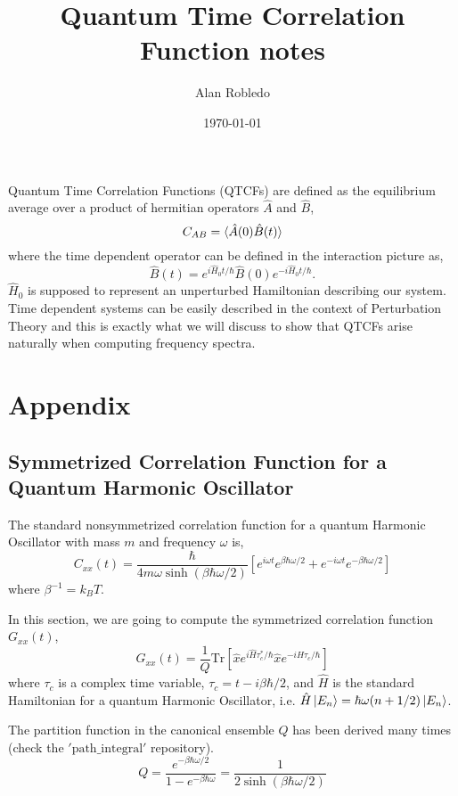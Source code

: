 \documentclass{article}
\title{Quantum Time Correlation Function notes}
\date{\today}
\author{Alan Robledo}
\newcommand{\be}{\begin{equation*}}
\newcommand{\ee}{\end{equation*}}
\begin{document}
\maketitle
Quantum Time Correlation Functions (QTCFs) are defined as the equilibrium average over a product of hermitian operators $\hat{A}$ and $\hat{B}$,
\be
  C_{AB} = \braket{\hat{A}(0) \hat{B}(t)}
\ee
where the time dependent operator can be defined in the interaction picture as,
\be
  \hat{B}(t) = e^{i \hat{H}_0 t/ \hbar} \hat{B}(0) e^{-i \hat{H}_0 t/ \hbar} .
\ee
$\hat{H}_0$ is supposed to represent an unperturbed Hamiltonian describing our system. Time dependent systems can be easily described in the context of Perturbation Theory and this is exactly what we will discuss to show that QTCFs arise naturally when computing frequency spectra.


\section{Appendix}
\subsection{Symmetrized Correlation Function for a Quantum Harmonic Oscillator}
The standard nonsymmetrized correlation function for a quantum Harmonic Oscillator with mass $m$ and frequency $\omega$ is,
\be
  C_{xx}(t) = \frac{\hbar}{4 m \omega \sinh(\beta \hbar \omega/2)} \left[ e^{i \omega t} e^{\beta \hbar \omega/2} + e^{-i \omega t} e^{-\beta \hbar \omega/2} \right]
\ee
where $\beta^{-1} = k_B T$.

In this section, we are going to compute the symmetrized correlation function $G_{xx}(t)$,
\be
  G_{xx}(t) = \frac{1}{Q} \text{Tr} \left[ \hat{x} e^{i \hat{H} \tau^*_c / \hbar} \hat{x} e^{-i \hat{H} \tau_c / \hbar}\right]
\ee
where $\tau_c$ is a complex time variable, $\tau_c = t - i\beta \hbar/2$, and $\hat{H}$ is the standard Hamiltonian for a quantum Harmonic Oscillator, i.e. $\hat{H} \ket{E_n} = \hbar \omega(n+1/2) \ket{E_n}$.

The partition function in the canonical ensemble $Q$ has been derived many times (check the $'\text{path}\_\text{integral}'$ repository).
\be
  Q = \frac{e^{-\beta \hbar \omega/2}}{1-e^{-\beta \hbar \omega}} = \frac{1}{2 \sinh(\beta \hbar \omega /2)}
\ee
\end{document}

